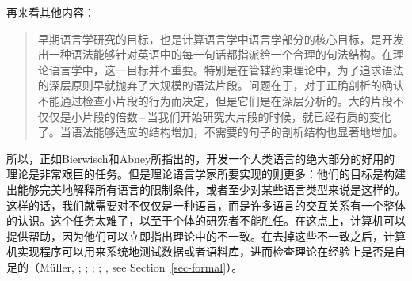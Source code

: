 再来看其他内容：
\begin{quote}
早期语言学研究的目标，也是计算语言学中语言学部分的核心目标，是开发出一种语法能够针对英语中的每一句话都指派给一个合理的句法结构。在理论语言学中，这一目标并不重要。特别是在管辖约束理论中，为了追求语法的深层原则早就抛弃了大规模的语法片段。问题在于，对于正确剖析的确认不能通过检查小片段的行为而决定，但是它们是在深层分析的。大的片段不仅仅是小片段的倍数\,--\,当我们开始研究大片段的时候，就已经有质的变化了。当语法能够适应的结构增加，不需要的句子的剖析结构也显著地增加。\citep[]{Abney96a}
\end{quote}
%
所以，正如Bierwisch和Abney所指出的，开发一个人类语言的绝大部分的好用的理论是非常艰巨的任务。但是理论语言学家所要实现的则更多：他们的目标是构建出能够完美地解释所有语言的限制条件，或者至少对某些语言类型来说是这样的。这样的话，我们就需要对不仅仅是一种语言，而是许多语言的交互关系有一个整体的认识。这个任务太难了，以至于个体的研究者不能胜任。在这点上，计算机可以提供帮助，因为他们可以立即指出理论中的不一致。在去掉这些不一致之后，计算机实现程序可以用来系统地测试数据或者语料库，进而检查理论在经验上是否是自足的（Müller, \citeyear[Chapter~22]{Mueller99a}; \citeyear{MuellerCoreGram}; \citeyear{MuellerKernigkeit}; \citealp{OF98}; \citealp{Bender2008c}, see Section~\ref{sec-formal}）。
